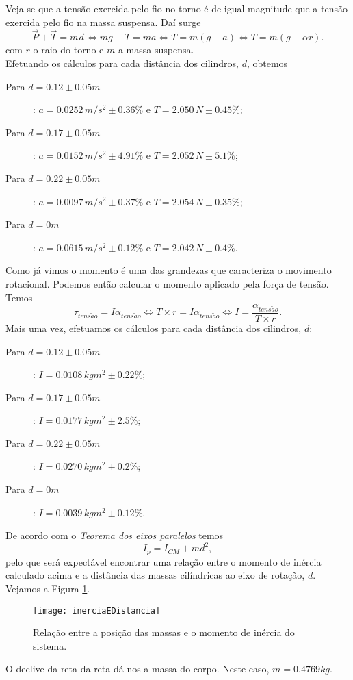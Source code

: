 \documentclass[11pt]{report}
\begin{document}
Veja-se que a tensão exercida pelo fio no torno é de igual magnitude que a tensão exercida pelo fio na massa suspensa. Daí surge
 $$\overrightarrow{P}+\overrightarrow{T}=m\overrightarrow{a} \iff mg-T=ma \iff T=m(g-a)\iff T=m(g-\alpha r). $$
 com $r$ o raio do torno e $m$ a massa suspensa.\\
 Efetuando os cálculos para cada distância dos cilindros, $d$, obtemos
 \begin{description}
 \item[Para $d=0.12\pm0.05 m $]: $a=0.0252\,m/s^2\pm0.36\%$ e $T=2.050\,N\pm0.45\%$;
\item[Para $d=0.17\pm0.05 m $]: $a=0.0152\,m/s^2\pm4.91\%$ e $T=2.052\,N\pm 5.1\%$;
\item[Para $d=0.22\pm0.05 m $]: $a=0.0097\,m/s^2\pm0.37\%$ e $T=2.054\,N\pm0.35\%$;
\item[Para $d=0 m $]: $a=0.0615\,m/s^2\pm0.12\%$ e $T=2.042\,N\pm0.4\%$.
 \end{description}
 
 Como já vimos o momento é uma das grandezas que caracteriza o movimento rotacional. Podemos então calcular o momento aplicado pela força de tensão.\\
 Temos $$\tau_{tens\tilde{a}o} = I \alpha_{tens\tilde{a}o} \iff T\times r =  I \alpha_{tens\tilde{a}o} \iff I = \frac{\alpha_{tens\tilde{a}o}}{T\times r}. $$
 Mais uma vez, efetuamos os cálculos para cada distância dos cilindros, 
 $d$:
  \begin{description}
 \item[Para $d=0.12\pm0.05 m $]: $I= 0.0108\,kgm^2\pm0.22\%$;
\item[Para $d=0.17\pm0.05 m $]: $I=0.0177\,kgm^2\pm2.5\%$;
\item[Para $d=0.22\pm0.05 m $]: $I=0.0270\,kgm^2\pm0.2\%$;
\item[Para $d=0 m $]: $I=0.0039\,kgm^2\pm0.12\%$.
 \end{description}
 
De acordo com o \textit{Teorema dos eixos paralelos}\cite{Cruz} temos
$$ I_p=I_{CM}+md^2,$$ 
pelo que será expectável encontrar uma relação entre o momento de inércia calculado acima e a distância das massas cilíndricas ao eixo de rotação, $d$. Vejamos a Figura \ref{figura:5.13}.

\begin{figure} [H]
\center
\texttt{[image: inerciaEDistancia]}
\caption{Relação entre a posição das massas e o momento de inércia do sistema. \label{figura:5.13}}
\end{figure}
O declive da reta da reta dá-nos a massa do corpo. Neste caso, $m=0.4769 kg.$
\end{document}
